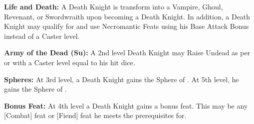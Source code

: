 \textbf{Life and Death:} A Death Knight is transform into a Vampire, Ghoul, Revenant, or Swordwraith upon becoming a Death Knight. In addition, a Death Knight may qualify for and use Necromantic Feats using his Base Attack Bonus instead of a Caster level.

\textbf{Army of the Dead (Su):} A 2nd level Death Knight may Raise Undead as per  or  with a Caster level equal to his hit dice.

\textbf{Spheres:} At 3rd level, a Death Knight gains the Sphere of . At 5th level, he gains the Sphere of .

\textbf{Bonus Feat:} At 4th level a Death Knight gains a bonus feat. This may be any [Combat] feat or [Fiend] feat he meets the prerequisites for.



